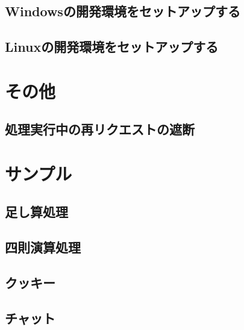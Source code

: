 \subsection{Windowsの開発環境をセットアップする}

\subsection{Linuxの開発環境をセットアップする}

\section{その他}
\subsection{処理実行中の再リクエストの遮断}

\newpage
\section{サンプル}
\subsection{足し算処理}

\newpage
\subsection{四則演算処理}

\newpage
\subsection{クッキー}

\newpage
\subsection{チャット}










